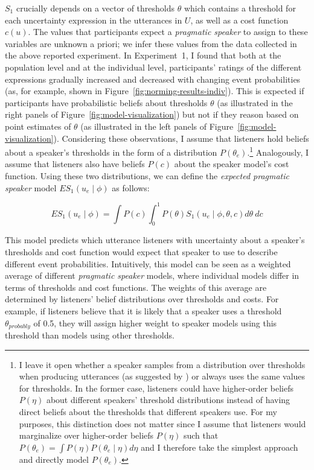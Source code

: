 $S_1$ crucially depends on a vector of thresholds $\theta$ which contains a threshold for each uncertainty expression in the utterances in $U$, 
as well as a cost function $c(u)$. The values that participants expect a \textit{pragmatic speaker} to assign 
to these variables are unknown a priori; we infer these values from the data collected in the above reported experiment. 
In Experiment~1, I found that both at the population level and at the individual level, 
participants' ratings of the different expressions gradually increased and decreased with changing event probabilities 
(as, for example, shown in Figure~\ref{fig:norming-results-indiv}). This is expected if participants
have probabilistic beliefs about thresholds $\theta$ (as illustrated in the right panels of Figure~\ref{fig:model-visualization}) but not if they reason based on point estimates of $\theta$ (as illustrated in the left panels of Figure~\ref{fig:model-visualization}).
Considering these observations,  I assume that listeners hold beliefs about a speaker's thresholds in the form of a distribution $P\left(\theta_e\right)$.\footnote{I leave it open 
whether a {speaker} samples from a distribution over thresholds when producing utterances (as suggested by \textcite{Qing2015}) 
or always uses the same values for thresholds. In the former case, listeners could have higher-order beliefs  $P(\eta)$ 
about different {speakers}' threshold distributions instead of having direct beliefs about the thresholds that different 
{speakers} use. For my purposes, this distinction does not matter since I assume that listeners would marginalize over higher-order beliefs $P(\eta)$ such that  $P\left(\theta_e\right) = \int P\left(\eta\right) P\left(\theta_e \mid \eta\right) d\eta$ and I therefore take the simplest approach and directly model $P\left(\theta_e\right)$. } Analogously, I assume that  listeners also have beliefs $P(c)$ about the speaker model's cost function.
Using these two distributions, we can define the \textit{expected pragmatic speaker} model $ES_1\left(u_e \mid \phi \right)$ as follows:

$$ES_1\left(u_e \mid \phi \right) = \int P(c) \int_0^1 P(\theta) S_1\left(u _e\mid \phi, \theta, c\right) d\theta \  d c$$

This model predicts which utterance listeners with uncertainty about a speaker's thresholds and cost function would expect that {speaker} to use to describe different event probabilities. 
Intuitively, this model can be seen as a weighted average of different \textit{pragmatic speaker} models, where individual models differ in terms of thresholds and cost functions.  The weights of this average are determined by listeners' belief distributions over thresholds and costs. For example, if listeners believe that it is likely that a speaker uses a threshold $\theta_{probably}$ of 0.5, they will assign higher weight to speaker models
using this threshold than models using other thresholds. 

